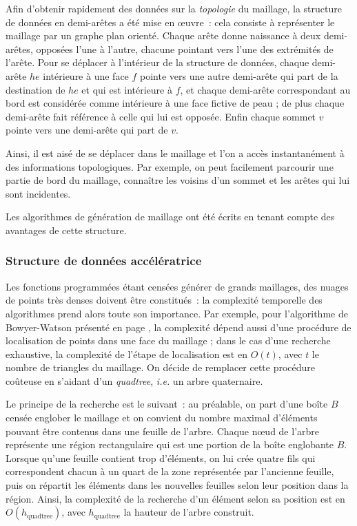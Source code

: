 \documentclass[12pt,a4paper]{report}
\begin{document}
Afin d'obtenir rapidement des données sur la \emph{topologie} du maillage, la structure de données en demi-arêtes a été mise en \oe{}uvre~: cela consiste à représenter le maillage par un graphe plan orienté. Chaque arête donne naissance à deux demi-arêtes, opposées l'une à l'autre, chacune pointant vers l'une des extrémités de l'arête. Pour se déplacer à l'intérieur de la structure de données, chaque demi-arête $he$ intérieure à une face $f$ pointe vers une autre demi-arête qui part de la destination de $he$ et qui est intérieure à $f$, et chaque demi-arête correspondant au bord est considérée comme intérieure à une face fictive de \og peau \fg{} ; de plus chaque demi-arête fait référence à celle qui lui est opposée. Enfin chaque sommet $v$ pointe vers une demi-arête qui part de $v$.

Ainsi, il est aisé de se déplacer dans le maillage et l'on a accès instantanément à des informations topologiques. Par exemple, on peut facilement parcourir une partie de bord du maillage, connaître les voisins d'un sommet et les arêtes qui lui sont incidentes.

Les algorithmes de génération de maillage ont été écrits en tenant compte des avantages de cette structure.



\subsubsection{Structure de données accélératrice}

Les fonctions programmées étant censées générer de \og grands \fg{} maillages, des nuages de points très denses doivent être constitués~: la  complexité temporelle des algorithmes prend alors toute son importance. Par exemple, pour l'algorithme de Bowyer-Watson présenté en page \pageref{Bowyer-Watson}, la complexité dépend aussi d'une procédure de localisation de points dans une face du maillage ; dans le cas d'une recherche exhaustive, la complexité de l'étape de localisation est en $O(t)$, avec $t$ le nombre de triangles du maillage. On décide de remplacer cette procédure coûteuse en s'aidant d'un \emph{quadtree}, \emph{i.e.} un arbre quaternaire.

Le principe de la recherche est le suivant~: au préalable, on part d'une boîte $B$ censée englober le maillage et on convient du nombre maximal d'éléments pouvant être contenus dans une feuille de l'arbre. Chaque n\oe{}ud de l'arbre représente une région rectangulaire qui est une portion de la boîte englobante $B$. Lorsque qu'une feuille contient trop d'éléments, on lui crée quatre fils qui correspondent chacun à un quart de la zone représentée par l'ancienne feuille, puis on répartit les éléments dans les nouvelles feuilles selon leur position dans la région. Ainsi, la complexité de la recherche d'un élément selon sa position est en $O(h_{\text{quadtree}})$, avec $h_{\text{quadtree}}$ la hauteur de l'arbre construit.
\end{document}
